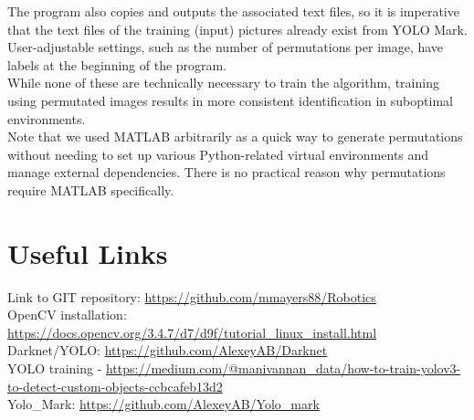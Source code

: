 \documentclass[a4paper,12pt]{article}
\begin{document}
	The program also copies and outputs the associated text files, so it is imperative that the text files of the training (input) pictures already exist from YOLO Mark. User-adjustable settings, such as the number of permutations per image, have labels at the beginning of the program.\\
	
	While none of these are technically necessary to train the algorithm, training using permutated images results in more consistent identification in suboptimal environments.\\
	
	Note that we used MATLAB arbitrarily as a quick way to generate permutations without needing to set up various Python-related virtual environments and manage external dependencies. There is no practical reason why permutations require MATLAB specifically.

	



\section{Useful Links}
Link to GIT repository: \href{https://github.com/mmayers88/Robotics}{https://github.com/mmayers88/Robotics}\\

OpenCV installation: \href{https://docs.opencv.org/3.4.7/d7/d9f/tutorial_linux_install.html}{https://docs.opencv.org/3.4.7/d7/d9f/tutorial\_linux\_install.html}\\

Darknet/YOLO: \href{https://github.com/AlexeyAB/Darknet}{https://github.com/AlexeyAB/Darknet}\\

YOLO training - \href{https://medium.com/@manivannan_data/how-to-train-yolov3-to-detect-custom-objects-ccbcafeb13d2}{https://medium.com/@manivannan\_data/how-to-train-yolov3-to-detect-custom-objects-ccbcafeb13d2}\\

Yolo\_Mark: \href{https://github.com/AlexeyAB/Yolo_mark}{https://github.com/AlexeyAB/Yolo\_mark}\\
\end{document}
